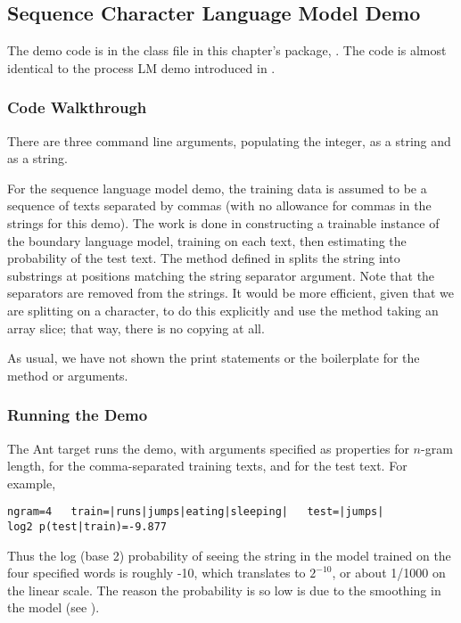 \subsection{Sequence Character Language Model Demo}

The demo code is in the class file  in this
chapter's package, .  The code
is almost identical to the process LM demo introduced in
.

\subsubsection{Code Walkthrough}

There are three command line arguments, populating the 
integer,  as a string and  as a string.

For the sequence language model demo, the training data is assumed to
be a sequence of texts separated by commas (with no allowance for
commas in the strings for this demo).  The work is done in
constructing a trainable instance of the boundary language model,
training on each text, then estimating the probability of the test
text.
%
%
The method  defined in 
splits the string into substrings at positions matching the string
separator argument.  Note that the separators are removed from the
strings.  It would be more efficient, given that we are splitting
on a character, to do this explicitly and use the 
method taking an array slice; that way, there is no copying at all.

As usual, we have not shown the print statements or the boilerplate
for the  method or arguments.

\subsubsection{Running the Demo}

The Ant target  runs the demo, with arguments
specified as properties  for $n$-gram length, 
 for the comma-separated training texts,
and  for the test text.  For example,
%
\begin{verbatim}
ngram=4   train=|runs|jumps|eating|sleeping|   test=|jumps|
log2 p(test|train)=-9.877
\end{verbatim}
%
Thus the log (base 2) probability of seeing the string
 in the model trained on the four specified words
is roughly -10, which translates to $2^{-10}$, or about 1/1000 on the
linear scale.  The reason the probability is so low is due to the
smoothing in the model (see ).

